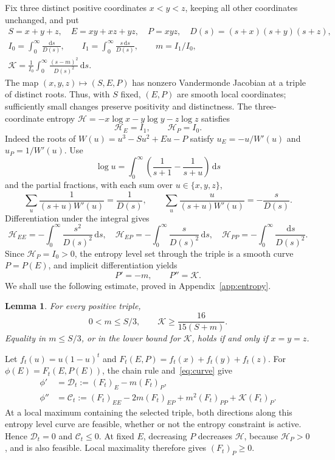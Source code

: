 \documentclass[11pt]{article}
\numberwithin{equation}{section}
\newtheorem{lemma}[theorem]{Lemma}
\newcommand{\dd}{\,\mathrm d}
\newcommand{\K}{\mathcal K}
\newcommand{\HH}{\mathcal H}
\begin{document}
Fix three distinct positive coordinates $x<y<z$, keeping all other
coordinates unchanged, and put
\begin{equation}\label{eq:geometry}
\begin{gathered}
 S=x+y+z,\quad E=xy+xz+yz,\quad P=xyz,\quad D(s)=(s+x)(s+y)(s+z),\\
 I_0=\int_0^\infty\frac{\dd s}{D(s)},\qquad
 I_1=\int_0^\infty\frac{s\dd s}{D(s)},\qquad m=I_1/I_0,\\
 \K=\frac1{I_0}\int_0^\infty\frac{(s-m)^2}{D(s)^2}\dd s.
\end{gathered}
\end{equation}
The map $(x,y,z)\mapsto(S,E,P)$ has nonzero Vandermonde Jacobian at a
triple of distinct roots. Thus, with $S$ fixed, $(E,P)$ are smooth local
coordinates; sufficiently small changes preserve positivity and distinctness.
The three-coordinate entropy $\HH=-x\log x-y\log y-z\log z$ satisfies
\begin{equation}\label{eq:entropy-derivatives}
 \HH_E=I_1,\qquad \HH_P=I_0.
\end{equation}
Indeed the roots of $W(u)=u^3-Su^2+Eu-P$ satisfy
$u_E=-u/W'(u)$ and $u_P=1/W'(u)$. Use
\[
 \log u=\int_0^\infty\left(\frac1{s+1}-\frac1{s+u}\right)\dd s
\]
and the partial fractions, with each sum over $u\in\{x,y,z\}$,
\[
 \sum_u\frac1{(s+u)W'(u)}=\frac1{D(s)},\qquad
 \sum_u\frac{u}{(s+u)W'(u)}=-\frac{s}{D(s)}.
\]
Differentiation under the integral gives
\[
 \HH_{EE}=-\int_0^\infty\frac{s^2}{D(s)^2}\dd s,\quad
 \HH_{EP}=-\int_0^\infty\frac{s}{D(s)^2}\dd s,\quad
 \HH_{PP}=-\int_0^\infty\frac{\dd s}{D(s)^2}.
\]
Since $\HH_P=I_0>0$, the entropy level set through the triple is a smooth
curve $P=P(E)$, and implicit differentiation yields
\begin{equation}\label{eq:curve}
 P'=-m,\qquad P''=\K.
\end{equation}
We shall use the following estimate, proved in Appendix~\ref{app:entropy}.
\begin{lemma}\label{lem:entropy}
For every positive triple,
\begin{equation}\label{eq:entropy-bound}
 0<m\le S/3,\qquad \K\ge\frac{16}{15(S+m)}.
\end{equation}
Equality in $m\le S/3$, or in the lower bound for $\K$, holds if and only
if $x=y=z$.
\end{lemma}

Let $f_t(u)=u(1-u)^t$ and $F_t(E,P)=f_t(x)+f_t(y)+f_t(z)$. For
$\phi(E)=F_t(E,P(E))$, the chain rule and~\eqref{eq:curve} give
\begin{equation}\label{eq:variations}
\begin{aligned}
 \phi'&=\mathcal D_t:=(F_t)_E-m(F_t)_P,\\
 \phi''&=\mathcal C_t:=(F_t)_{EE}-2m(F_t)_{EP}
                  +m^2(F_t)_{PP}+\K(F_t)_P.
\end{aligned}
\end{equation}
At a local maximum containing the selected triple, both directions along
this entropy level curve are feasible, whether or not the entropy constraint
is active. Hence $\mathcal D_t=0$ and $\mathcal C_t\le0$. At fixed $E$,
decreasing $P$ decreases $\HH$, because $\HH_P>0$, and is also feasible.
Local maximality therefore gives $(F_t)_P\ge0$.
\end{document}
